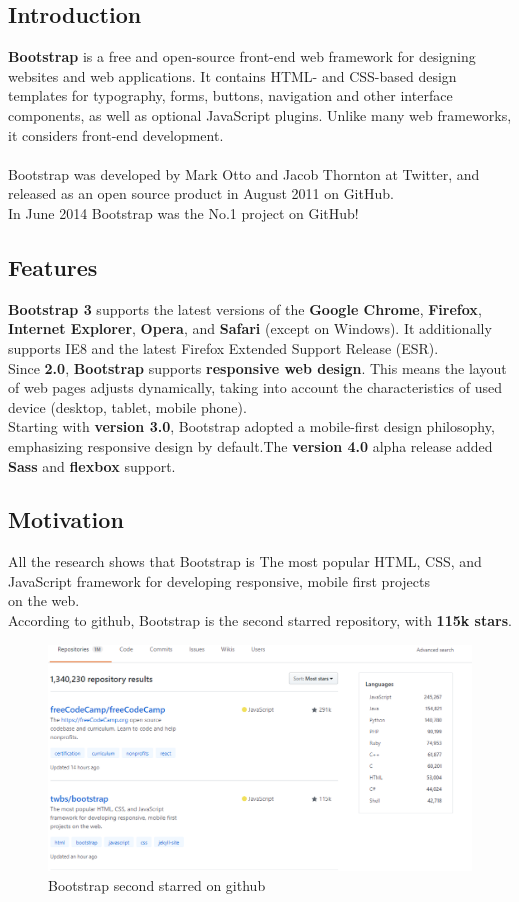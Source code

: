 \documentclass[12pt]{article}
\begin{document}
	\subsection{Introduction}
	\textbf{Bootstrap} is a free and open-source front-end web framework for designing websites and web applications. It contains HTML- and CSS-based design templates for typography, forms, buttons, navigation and other interface components, as well as optional JavaScript plugins. Unlike many web frameworks, it considers front-end development.
	\\
	\\
	Bootstrap was developed by Mark Otto and Jacob Thornton at Twitter, and released as an open source product in August 2011 on GitHub.\\
	In June 2014 Bootstrap was the No.1 project on GitHub!
	\subsection{Features}
	\textbf{Bootstrap 3} supports the latest versions of the \textbf{Google Chrome}, \textbf{Firefox}, \textbf{Internet Explorer}, \textbf{Opera}, and \textbf{Safari} (except on Windows). It additionally supports IE8 and the latest Firefox Extended Support Release (ESR).
	\\
	Since \textbf{2.0}, \textbf{Bootstrap} supports \textbf{responsive web design}. This means the layout of web pages adjusts dynamically, taking into account the characteristics of used device (desktop, tablet, mobile phone).
	\\
	Starting with \textbf{version 3.0}, Bootstrap adopted a mobile-first design philosophy, emphasizing responsive design by default.The \textbf{version 4.0} alpha release added \textbf{Sass} and \textbf{flexbox} support.
	\subsection{Motivation}
	All the research shows that Bootstrap is The most popular HTML, CSS, and JavaScript framework for developing responsive, mobile first projects \\ on the web.
	\\
	According to github, Bootstrap is the second starred repository, with \textbf{115k stars}.
		\begin{figure}[h]
		\centering
		\includegraphics[width=1\textwidth]{Boostrap_statics_github.png}
		\caption{Bootstrap second starred on github}
	\end{figure}
\end{document}
